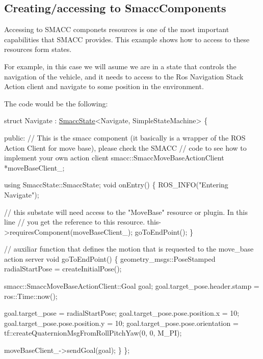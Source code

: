 \subsection*{Creating/accessing to Smacc\+Components}

Accessing to S\+M\+A\+CC componets resources is one of the most important capabilities that S\+M\+A\+CC provides. This example shows how to access to these resources form states.

For example, in this case we will asume we are in a state that controls the navigation of the vehicle, and it needs to access to the Ros Navigation Stack Action client and navigate to some position in the environment.

 

The code would be the following\+:


\begin{DoxyCode}
\textcolor{keyword}{struct }Navigate : \hyperlink{classSmaccState}{SmaccState}<Navigate, SimpleStateMachine> 
\{

\textcolor{keyword}{public}:
  \textcolor{comment}{// This is the smacc component (it basically is a wrapper of the ROS Action Client for move base), please
       check the SMACC}
  \textcolor{comment}{// code to see how to implement your own action client}
  smacc::SmaccMoveBaseActionClient *moveBaseClient\_;

  \textcolor{keyword}{using} SmaccState::SmaccState;
  \textcolor{keywordtype}{void} onEntry()
  \{
    ROS\_INFO(\textcolor{stringliteral}{"Entering Navigate"});

    \textcolor{comment}{// this substate will need access to the "MoveBase" resource or plugin. In this line}
    \textcolor{comment}{// you get the reference to this resource.}
    this->requiresComponent(moveBaseClient\_);
    goToEndPoint();
  \}

  \textcolor{comment}{// auxiliar function that defines the motion that is requested to the move\_base action server}
  \textcolor{keywordtype}{void} goToEndPoint() \{
    geometry\_msgs::PoseStamped radialStartPose = createInitialPose();

    smacc::SmaccMoveBaseActionClient::Goal goal;
    goal.target\_pose.header.stamp = ros::Time::now();

    goal.target\_pose = radialStartPose;
    goal.target\_pose.pose.position.x = 10;
    goal.target\_pose.pose.position.y = 10;
    goal.target\_pose.pose.orientation =
        tf::createQuaternionMsgFromRollPitchYaw(0, 0, M\_PI);

    moveBaseClient\_->sendGoal(goal);
  \}
\};
\end{DoxyCode}


